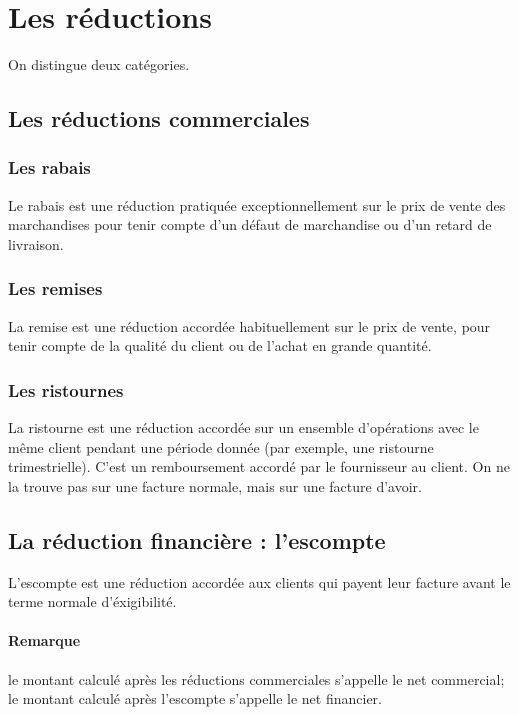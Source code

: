 \documentclass[11pt]{article}
\begin{document}
	\section{Les réductions}
		On distingue deux catégories.
		
		\subsection{Les réductions commerciales}
			\subsubsection{Les rabais}
				Le rabais est une réduction pratiquée exceptionnellement sur le prix de vente des marchandises pour tenir compte d'un défaut de marchandise ou d'un retard de livraison.
				
			\subsubsection{Les remises}
				La remise est une réduction accordée habituellement sur le prix de vente, pour tenir compte de la qualité du client ou de l'achat en grande quantité.
				
			\subsubsection{Les ristournes}
				La ristourne est une réduction accordée sur un ensemble d'opérations avec le même client pendant une période donnée (par exemple, une ristourne trimestrielle). C'est un remboursement accordé par le fournisseur au client. On ne la trouve pas sur une facture normale, mais sur une facture d'avoir.
				
		\subsection{La réduction financière : l'escompte}
			L'escompte est une réduction accordée aux clients qui payent leur facture avant le terme normale d'éxigibilité.
			
			\paragraph{Remarque} le montant calculé après les réductions commerciales s'appelle le net commercial; le montant calculé après l'escompte s'appelle le net financier.
			
\end{document}
